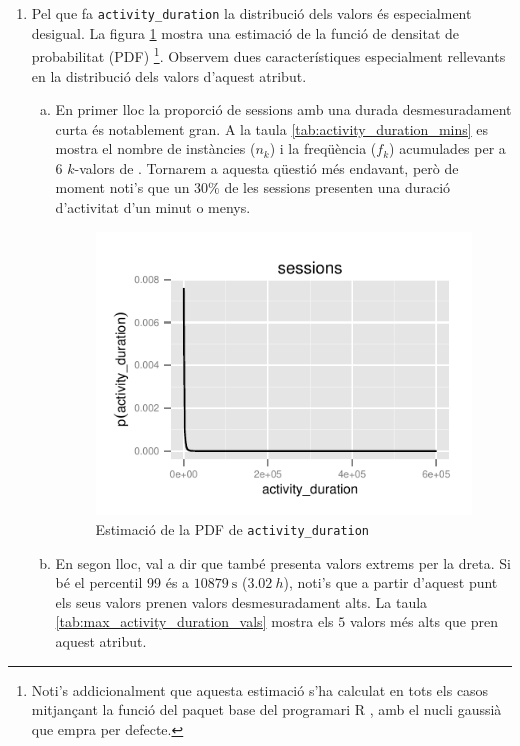 \documentclass[
	a4paper,
	twoside,
	justified
]{tufte-book}
\begin{document}
\begin{enumerate}[(1)]
\item Pel que fa \texttt{activity\_duration} la distribució dels valors és especialment desigual. La figura \ref{graph:activity_duration_dens} mostra una estimació de la funció de densitat de probabilitat (PDF) \citep{silverman86}\footnote[][\baselineskip]{Noti's addicionalment que aquesta estimació s'ha calculat en tots els casos mitjançant la funció  del paquet base del programari R \citep{rteam14}, amb el nucli gaussià que empra per defecte.}. Observem dues característiques especialment rellevants en la distribució dels valors d'aquest atribut.
	\begin{enumerate}[(a)]
	\item En primer lloc la proporció de sessions amb una durada desmesuradament curta és notablement gran. A la taula \ref{tab:activity_duration_mins} es mostra el nombre de instàncies ($n_k$) i la freqüència ($f_k$) acumulades per a 6 $k$-valors de . Tornarem a aquesta qüestió més endavant, però de moment noti's que un $30\%$ de les sessions presenten una duració d'activitat d'un minut o menys.
	
	\begin{figure}
    \begin{center}
    \includegraphics{activity_duration_a_dens}
    \end{center}
    \caption{
    \label{graph:activity_duration_dens}
    	Estimació de la PDF de \texttt{activity\_duration}
    }
  \end{figure}
	
	\item En segon lloc, val a dir que també presenta valors extrems per la dreta. Si bé el percentil 99 és a $\SI{10879}{\second}$ ($\SI{3.02}{h}$), noti's que a partir d'aquest punt els seus valors prenen valors desmesuradament alts. La taula \ref{tab:max_activity_duration_vals} mostra els $5$ valors més alts que pren aquest atribut.


\end{enumerate}
\end{enumerate}
\end{document}
